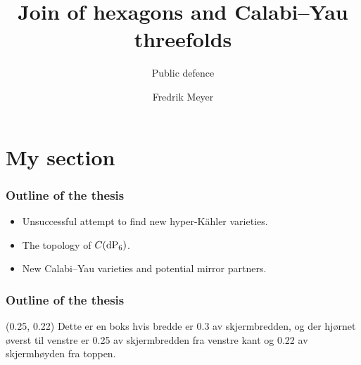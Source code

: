\documentclass[UKenglish]{beamer}
\title{Join of hexagons and {Calabi--Yau} threefolds}
\subtitle{Public defence}
\author{Fredrik Meyer}
\begin{document}
\section[Section]{My section}
\begin{frame}
\frametitle{Outline of the thesis}

\begin{itemize}
	\item Unsuccessful attempt to find new hyper-Kähler varieties. \pause
	\item The topology of $C(\dP6)$. \pause
	\item New Calabi--Yau varieties and potential mirror partners.
\end{itemize}

\end{frame}

\begin{frame}
\frametitle{Outline of the thesis}

    \begin{textblock}{0.3}(0.25, 0.22)
        Dette er en boks hvis bredde er \alert{0.3} av skjermbredden, og der hjørnet øverst til venstre er \alert{0.25} av skjermbredden fra venstre kant og \alert{0.22} av skjermhøyden fra toppen.
    \end{textblock}

\end{frame}
\end{document}
